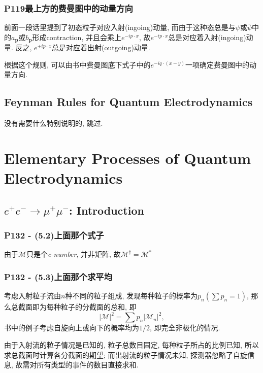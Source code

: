 \documentclass[10pt,b5paper,openany]{book}
\begin{document}
\subsection{P119最上方的费曼图中的动量方向}

前面一段话里提到了初态粒子对应入射(ingoing)动量, 而由于这种态总是与$\psi$或$\bar{\psi}$中的$a_{\mathbf{p}}$或$b_{\mathbf{p}}$形成contraction, 并且会乘上$e^{-ip\cdot x}$, 故$e^{-ip\cdot x}$总是对应着入射(ingoing)动量. 反之, $e^{+ip\cdot x}$总是对应着出射(outgoing)动量. 

根据这个规则, 可以由书中费曼图底下式子中的$e^{-iq\cdot (x-y)}$一项确定费曼图中的动量方向. 

\section{Feynman Rules for Quantum Electrodynamics}
没有需要什么特别说明的, 跳过. 

\clearpage

\chapter{Elementary Processes of Quantum Electrodynamics}

\section{\texorpdfstring{$e^+e^- \rightarrow \mu^+\mu^-$}:: Introduction}

\subsection{P132 - (5.2)上面那个式子}

由于$\mathcal{M}$只是个\textit{c-number}, 并非矩阵, 故$\mathcal{M}^\dagger = \mathcal{M}^*$

\subsection{P132 - (5.3)上面那个求平均}

考虑入射粒子流由$n$种不同的粒子组成, 发现每种粒子的概率为$p_n(\sum p_n = 1)$, 那么总截面即为每种粒子的分截面的总和, 即
\begin{equation}
  |\mathcal{M}|^2 = \sum p_n |\mathcal{M}_n|^2, 
\end{equation}
书中的例子考虑自旋向上或向下的概率均为$1/2$, 即完全非极化的情况. 

由于入射流的粒子情况是已知的, 粒子总数目固定, 每种粒子所占的比例已知, 所以求总截面时计算各分截面的期望; 而出射流的粒子情况未知, 探测器忽略了自旋信息, 故需对所有类型的事件的数目直接求和. 
\end{document}
